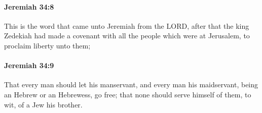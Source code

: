 		\paragraph{Jeremiah 34:8} %
			\label{JEREMIAH-34-8}

			This is the word that came unto Jeremiah from the LORD, after that the king Zedekiah had made a covenant with all the people which were at Jerusalem, to proclaim liberty unto them;


		\paragraph{Jeremiah 34:9} %
			\label{JEREMIAH-34-9}

			That every man should let his manservant, and every man his maidservant, being an Hebrew or an Hebrewess, go free; that none should serve himself of them, to wit, of a Jew his brother.



